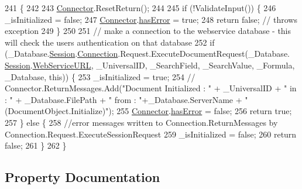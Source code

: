 \begin{DoxyCode}
241                              \{
242 
243         \hyperlink{class_connector}{Connector}.ResetReturn();
244 
245         \textcolor{keywordflow}{if} (!ValidateInput()) \{
246             \_isInitialized = \textcolor{keyword}{false};
247             \hyperlink{class_connector}{Connector}.\hyperlink{class_connector_a079bae21a5417efa53bfe8954c0f533f}{hasError} = \textcolor{keyword}{true};
248             \textcolor{keywordflow}{return} \textcolor{keyword}{false};   \textcolor{comment}{// throws exception}
249         \}
250 
251         \textcolor{comment}{// make a connection to the webservice database - this will check the users authentication on that
       database}
252         \textcolor{keywordflow}{if} (\_Database.\hyperlink{class_database_object_aa8484162b7d2a7c4c9426bca13c64c07}{Session}.\hyperlink{class_session_object_a014bdbf705a753540e19bfb53030c55c}{Connection}.Request.ExecuteDocumentRequest(\_Database.
      \hyperlink{class_database_object_aa8484162b7d2a7c4c9426bca13c64c07}{Session}.\hyperlink{class_session_object_a697c071c812fbf7ad1166b896fb44c16}{WebServiceURL}, \_UniversalID, \_SearchField, \_SearchValue, \_Formula, \_Database, \textcolor{keyword}{
      this})) \{
253             \_isInitialized = \textcolor{keyword}{true};
254             \textcolor{comment}{//  Connector.ReturnMessages.Add("Document Initialized : " + \_UniversalID + " in : " +
       \_Database.FilePath + " from : "+\_Database.ServerName + " (DocumentObject.Initialize)");}
255             \hyperlink{class_connector}{Connector}.\hyperlink{class_connector_a079bae21a5417efa53bfe8954c0f533f}{hasError} = \textcolor{keyword}{false};
256             \textcolor{keywordflow}{return} \textcolor{keyword}{true};
257         \} \textcolor{keywordflow}{else} \{
258             \textcolor{comment}{//error messages written to Connection.ReturnMessages by
       Connection.Request.ExecuteSessionRequest}
259             \_isInitialized = \textcolor{keyword}{false};
260             \textcolor{keywordflow}{return} \textcolor{keyword}{false};
261         \}
262     \}
\end{DoxyCode}


\subsection{Property Documentation}
\mbox{\label{class_document_object_a69d5338c9835f748490323d2950eed09}} 
